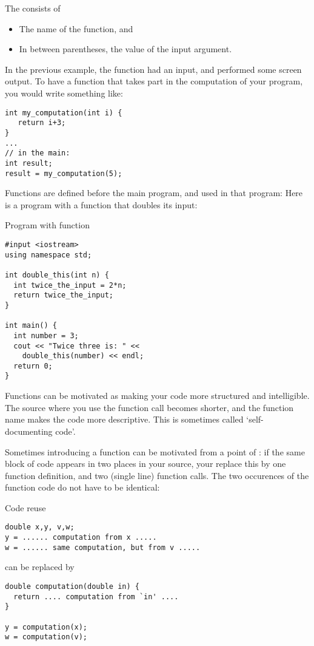 The  consists of
\begin{itemize}
\item The name of the function, and
\item In between parentheses, the value of the input argument.
\end{itemize}

In the previous example, the function had an input, and performed some
screen output. To have a function that takes part in the computation
of your program, you would write something like:
\begin{verbatim}
int my_computation(int i) {
   return i+3;
}
...
// in the main:
int result;
result = my_computation(5);
\end{verbatim}

Functions are defined before the main program, and used in that program:
Here is a program with a function that doubles its input:

\begin{block}{Program with function}
  \label{sl:fun-example}
  \small
\begin{verbatim}
#input <iostream>
using namespace std;

int double_this(int n) {
  int twice_the_input = 2*n;
  return twice_the_input;
}

int main() {
  int number = 3;
  cout << "Twice three is: " << 
    double_this(number) << endl;
  return 0;
}
\end{verbatim}
\end{block}

Functions can be motivated as making your code more structured and intelligible.
The source where you use the function call becomes shorter,
and the function
name makes the code more descriptive. This is sometimes called
`self-documenting code'.

Sometimes introducing a function can be motivated from a point of
: if the same block of code appears in two
places in your source, your replace this by one function definition,
and two (single line) function calls.
The two occurences of the function code do not have to be identical:


\begin{block}{Code reuse}
  \label{sl:reuse}
\begin{verbatim}
double x,y, v,w;
y = ...... computation from x .....
w = ...... same computation, but from v .....
\end{verbatim}
can be replaced by
\begin{verbatim}
double computation(double in) {
  return .... computation from `in' ....
}

y = computation(x);
w = computation(v);
\end{verbatim}
\end{block}

